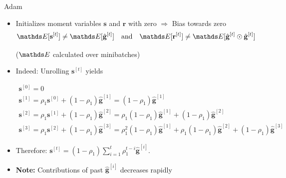 \documentclass[11pt,compress,t,notes=noshow, xcolor=table]{beamer}
\begin{document}
\begin{vbframe}{Adam}
\begin{algorithm}[H]
\begin{algorithmic}[1]
			\EndWhile
		\end{algorithmic}
	\end{algorithm}
	
	
	\framebreak
	
	
	\begin{itemize}
		\item Initializes moment variables $\mathbf{s}$ and $\mathbf{r}$ with zero $\Rightarrow$ Bias towards zero
            \begin{equation*}
                \E[\mathbf{s}^{[t]}] \neq \E [\hat{\mathbf{g}}^{[t]}] \quad \text{and} \quad \E[\mathbf{r}^{[t]}] \neq \E [\hat{\mathbf{g}}^{[t]} \odot \hat{\mathbf{g}}^{[t]}]
            \end{equation*}
            
            \vspace{-0.75\baselineskip}
            
            \begin{center}
                ($\E$ calculated over minibatches)
            \end{center}
		\item Indeed: Unrolling $\mathbf{s}^{[t]}$ yields
            \begin{footnotesize}
        		\begin{gather*}
            		\mathbf{s}^{[0]} = 0 \\
            		\mathbf{s}^{[1]} = \rho_1\mathbf{s}^{[0]} + (1 - \rho_1) \hat{\mathbf{g}}^{[1]} = (1 - \rho_1) \hat{\mathbf{g}}^{[1]} \\
            		\mathbf{s}^{[2]} = \rho_1\mathbf{s}^{[1]} + (1 - \rho_1) \hat{\mathbf{g}}^{[2]} = \rho_1 (1 - \rho_1) \hat{\mathbf{g}}^{[1]} + (1 - \rho_1) \hat{\mathbf{g}}^{[2]} \\
            		\mathbf{s}^{[3]} = \rho_1\mathbf{s}^{[2]} + (1 - \rho_1) \hat{\mathbf{g}}^{[3]} = \rho_1^2 (1 - \rho_1) \hat{\mathbf{g}}^{[1]} + \rho_1 (1 - \rho_1) \hat{\mathbf{g}}^{[2]} + (1 - \rho_1) \hat{\mathbf{g}}^{[3]}
        		\end{gather*}
            \end{footnotesize}
		\item Therefore: $\mathbf{s}^{[t]}  = (1 - \rho_1) \sum_{i=1}^t \rho_1^{t - i} \hat{\mathbf{g}}^{[i]}$.
		\item \textbf{Note:} Contributions of past $\hat{\mathbf{g}}^{[i]}$ decreases rapidly
	\end{itemize}
	
	\framebreak
	

\end{vbframe}
\end{document}
